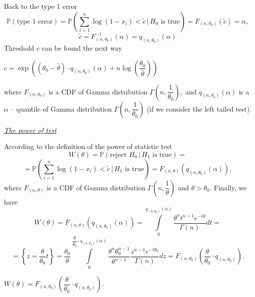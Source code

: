 \documentclass[a4paper, 12pt]{article}
\renewcommand*{\P}{\mathbb{P}}
\begin{document}
\noindent Back to the type 1 error
$$ 
\P(\text{type 1 error}) = \P \left( \sum \limits_{i=1}^n \log (1 - x_i) < \widetilde{c} \, | \, H_0 \text{ is true} \right) = F_{(n, \theta_0)}(\widetilde{c}) = \alpha,
$$
$$
\widetilde{c} = F_{(n, \theta_0)}^{-1}(\alpha) = q_{(n, \theta_0)}(\alpha)$$
Threshold $c$ can be found the next way
\begin{tcolorbox}
[enhanced,width=\textwidth,center upper,
 fontupper=\large\bfseries,
 drop fuzzy shadow southeast,
 colframe=red!50!black,colback=yellow!25]
$
c = \exp \left( (\theta_0 - \hat{\theta}) \cdot q_{(n, \theta_0)}(\alpha) + n \log \left( \dfrac{\theta_0}{\hat{\theta}} \right) \right)
$
\end{tcolorbox}
where $F_{(n, \theta_0)}$ is a CDF of Gamma distribution $\Gamma \left( n, \dfrac{1}{\theta_0} \right),$ and $q_{(n, \theta_0)}(\alpha)$ is a $\alpha$ -- quantile of Gamma distribution $\Gamma \left( n, \dfrac{1}{\theta_0} \right)$ (if we consider the left tailed test).\\

\begin{center}
\large \itshape \underline{The power of test}
\end{center}
According to the definition of the power of statistic test
$$
W(\theta) = \P (\text{reject } H_0 \, | \, H_1 \text{ is true}) = 
$$
$$
= \P \left( \sum \limits_{i=1}^n \log (1 - x_i) < \widetilde{c} \, | \, H_1 \text{ is true} \right) = F_{(n, \theta)}(q_{(n, \theta_0)}(\alpha)),
$$
where $F_{(n, \theta)}$ is a CDF of Gamma distribution $\Gamma \left( n, \dfrac{1}{\theta} \right)$ and $\theta > \theta_0.$
Finally, we have
$$
W(\theta) = F_{(n, \theta)}(q_{(n, \theta_0)}(\alpha)) = \int \limits_{0}^{q_{(n, \theta_0)}(\alpha)} \dfrac{\theta^n t^{n-1} e^{-t \theta}}{ \Gamma(n)} dt = 
$$
$$
= \left \{ z = \dfrac{\theta}{\theta_0} t \right \} = \dfrac{\theta_0}{\theta} \int \limits_{0}^{\dfrac{\theta}{\theta_0} \cdot q_{(n, \theta_0)}(\alpha)} \dfrac{\theta^n \theta_0^{n-1}}{\theta^{n-1}} \dfrac{z^{n-1} e^{-t \theta_0}}{\Gamma(n)} dz = F_{(n, \theta_0)} \left( \dfrac{\theta}{\theta_0} \cdot q_{(n, \theta_0)} \right).
$$
\begin{tcolorbox}
[enhanced,width=\textwidth,center upper,
 fontupper=\large\bfseries,
 drop fuzzy shadow southeast,
 colframe=red!50!black,colback=yellow!25]
$
W(\theta) = F_{(n, \theta_0)} \left( \dfrac{\theta}{\theta_0} \cdot q_{(n, \theta_0)} \right).
$
\end{tcolorbox}
\end{document}
